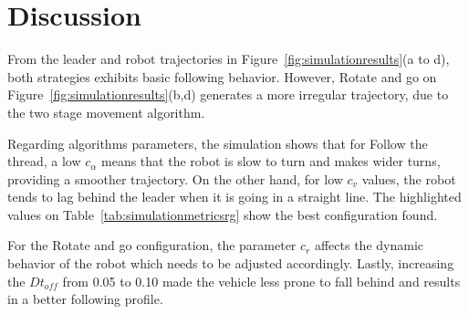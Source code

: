 \documentclass[journal]{IEEEtran}
\begin{document}
\section{Discussion}
\label{discussion}

From the leader and robot trajectories in Figure~\ref{fig:simulationresults}(a to d), both strategies exhibits basic following behavior.  However, Rotate and go on Figure~\ref{fig:simulationresults}(b,d) generates a more irregular trajectory, due to the two stage movement algorithm.   

Regarding algorithms parameters, the simulation shows that for Follow the thread, a low $c_{\alpha}$  means that the robot is slow to turn and makes wider turns, providing a smoother trajectory.  On the other hand, for low $c_v$ values, the robot tends to lag behind the leader when it is going in a straight line.  The highlighted values on Table~\ref{tab:simulationmetricsrg} show the best configuration found.  

For the Rotate and go configuration, the parameter $c_r$ affects the dynamic behavior of the robot which needs to be adjusted accordingly.  Lastly, increasing the $Dt_{off}$ from 0.05 to 0.10 made the vehicle less prone to fall behind and results in a better following profile.



\end{document}
